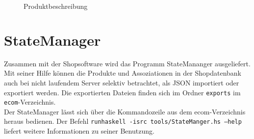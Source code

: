 \begin{figure}[h!]
  \centering
  \caption{Produktbeschreibung}
  \label{fig:Produktbeschreibung}
\end{figure}


\section{StateManager}
\label{sec:StateManager}
Zusammen mit der Shopsoftware wird das Programm StateMananger ausgeliefert. Mit seiner Hilfe können die Produkte und Assoziationen in der Shopdatenbank auch bei nicht laufendem Server selektiv betrachtet, als JSON importiert oder exportiert werden. Die exportierten Dateien finden sich im Ordner \texttt{exports} im \texttt{ecom}-Verzeichnis. \\
Der StateManager lässt sich über die Kommandozeile aus dem ecom-Verzeichnis heraus bedienen. Der Befehl \texttt{runhaskell -isrc tools/StateManger.hs --help} liefert weitere Informationen zu seiner Benutzung. 